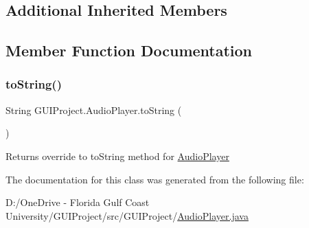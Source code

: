 \subsection*{Additional Inherited Members}


\subsection{Member Function Documentation}
\mbox{\label{class_g_u_i_project_1_1_audio_player_a2935cc2da8c1ef1bbcf2c7566fafbc74}} 
\subsubsection{\texorpdfstring{toString()}{toString()}}
{\footnotesize\ttfamily String G\+U\+I\+Project.\+Audio\+Player.\+to\+String (\begin{DoxyParamCaption}{ }\end{DoxyParamCaption})}

\begin{DoxyReturn}{Returns}
override to to\+String method for \mbox{\hyperlink{class_g_u_i_project_1_1_audio_player}{Audio\+Player}} 
\end{DoxyReturn}


The documentation for this class was generated from the following file\+:\begin{DoxyCompactItemize}
\item 
D\+:/\+One\+Drive -\/ Florida Gulf Coast University/\+G\+U\+I\+Project/src/\+G\+U\+I\+Project/\mbox{\hyperlink{_audio_player_8java}{Audio\+Player.\+java}}\end{DoxyCompactItemize}

